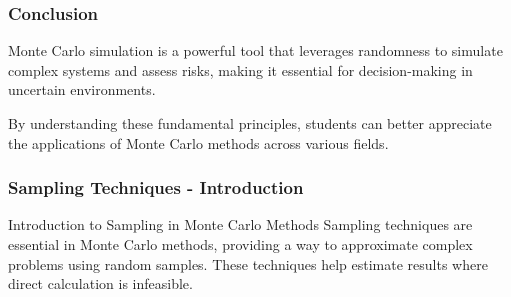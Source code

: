 \documentclass[aspectratio=169]{beamer}
\begin{document}
\begin{frame}[fragile]
  \frametitle{Conclusion}
  Monte Carlo simulation is a powerful tool that leverages randomness to simulate complex systems and assess risks, making it essential for decision-making in uncertain environments. 

  By understanding these fundamental principles, students can better appreciate the applications of Monte Carlo methods across various fields.
\end{frame}

\begin{frame}[fragile]
  \frametitle{Sampling Techniques - Introduction}
  \begin{block}{Introduction to Sampling in Monte Carlo Methods}
    Sampling techniques are essential in Monte Carlo methods, providing a way to approximate complex problems using random samples. These techniques help estimate results where direct calculation is infeasible.
  \end{block}
\end{frame}
\end{document}
